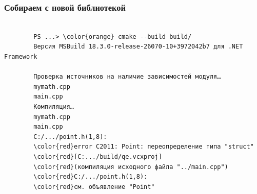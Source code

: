 \documentclass[9pt, aspectratio=1610]{beamer}
\begin{document}
\begin{frame}[fragile]\frametitle{Собираем с новой библиотекой}
	
	\begin{Verbatim}[bgcolor=black,tabsize=4,formatcom=\color{white},gobble=2,fontsize=\small, commandchars=\\\{\}, xleftmargin=0em, frame=single,framerule=0pt ,rulecolor=\color{red},framesep=1em,fillcolor=\color{black}]
		
		PS ...> \color{orange} cmake --build build/
		Версия MSBuild 18.3.0-release-26070-10+3972042b7 для .NET Framework
		
		Проверка источников на наличие зависимостей модуля…
		mymath.cpp
		main.cpp
		Компиляция…
		mymath.cpp
		main.cpp
		C:/.../point.h(1,8): 
		\color{red}error C2011: Point: переопределение типа "struct" 
		\color{red}[C:.../build/qe.vcxproj]
		\color{red}(компиляция исходного файла "../main.cpp")
		\color{red}C:/.../point.h(1,8):
		\color{red}см. объявление "Point"
		
	\end{Verbatim}
	
\end{frame}
\end{document}
